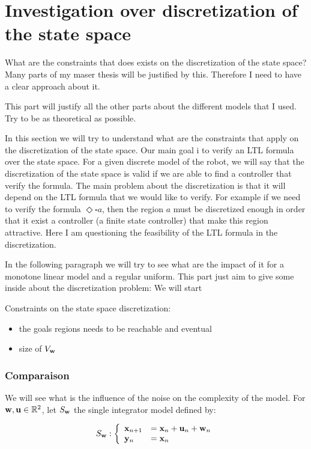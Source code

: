 \section{Investigation over discretization of the state space}
What are the constraints that does exists on the discretization of the state space?
Many parts of my maser thesis will be justified by this.
Therefore I need to have a clear approach about it.

This part will justify all the other parts about the different models that I used.
Try to be as theoretical as possible.
 

In this section we will try to understand what are the constraints that apply on the discretization of the state space.
Our main goal i to verify an LTL formula over the state space. For a given discrete model of the robot, we will say that the discretization of the state space is valid if we are able to find a controller that verify the formula.
The main problem about the discretization is that it will depend on the LTL formula that we would like to verify. For example if we need to verify the formula $\Diamond \square a$, then the region $a$ must be discretized enough in order that it exist a controller (a finite state controller) that make this region attractive.
Here I am questioning the feasibility of the LTL formula in the discretization.

In the following paragraph we will try to see what are the impact of it for a monotone linear model and a regular uniform.
This part just aim to give some inside about the discretization problem:
We will start

Constraints on the state space discretization:
\begin{itemize}[noitemsep,nolistsep,topsep=0pt,parsep=0pt,partopsep=0pt]
\item the goals regions needs to be reachable and eventual
\item size of $V_{ \mathbf{w}}$
\end{itemize}


\subsubsection{Comparaison}
We will see what is the influence of the noise on the complexity of the model.
For $ \mathbf{w}, \mathbf{u} \in \mathbb{R}^2$, let $S_{ \mathbf{w}}$ the single integrator model defined by:

\begin{equation}\label{eqn:sing_int}
S_{ \mathbf{w}}:
\left \{
\begin{array}{ll}
 \mathbf{x}_{n+1} &=  \mathbf{x}_n +  \mathbf{u}_n +  \mathbf{w}_n\\
 \mathbf{y}_n &=  \mathbf{x}_n
\end{array}
\right.
\end{equation}

